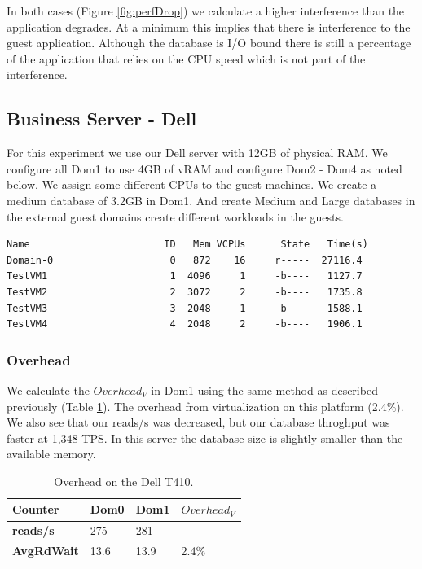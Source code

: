 In both cases (Figure \ref{fig:perfDrop}) we calculate a higher interference than the application degrades.  At a minimum this implies that there is interference to the guest application.  Although the database is I/O bound there is still a percentage of the application that relies on the CPU speed which is not part of the interference.  

\subsection{Business Server - Dell}
For this experiment we use our Dell server with 12GB of physical RAM. We configure all Dom1 to use 4GB of vRAM and configure Dom2 - Dom4 as noted below.  We assign some different CPUs to the guest machines. We create a medium database of 3.2GB in Dom1.   And create Medium and Large databases in the external guest domains create different workloads in the guests.

\begin{Verbatim}
Name                       ID   Mem VCPUs      State   Time(s)
Domain-0                    0   872    16     r-----  27116.4
TestVM1                     1  4096     1     -b----   1127.7
TestVM2                     2  3072     2     -b----   1735.8
TestVM3                     3  2048     1     -b----   1588.1
TestVM4                     4  2048     2     -b----   1906.1
\end{Verbatim}

\subsubsection{Overhead}
We calculate the $Overhead_V$ in Dom1 using the same method as described previously (Table \ref{tab:OverheadDell}).  The overhead from virtualization on this platform (2.4\%).  We also see that our reads/s was decreased, but our database throghput was faster at 1,348 TPS.  In this server the database size is slightly smaller than the available memory.

\begin{table}[h]
\begin{tabular}{ l l l p{5cm} }
  Counter     & Dom0 & Dom1 & $Overhead_V$ \\
  \hline
    \textbf{reads/s}    & 275  & 281 & \\
    \textbf{AvgRdWait}  & 13.6 & 13.9 & 2.4\% \\ 
  \hline
\end{tabular}
\caption{Overhead on the Dell T410.}
\label{tab:OverheadDell}
\end{table}

